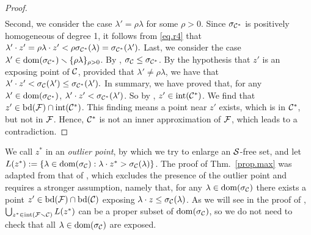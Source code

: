\begin{proof}
\begin{align}
	\end{align} Second, we consider the case $\lambda ' = \rho \lambda$ for some $\rho > 0$. Since $\sigma_{\mathcal C^\ast}$ is positively homogeneous of degree 1, it follows from \eqref{eq.r4} that $\lambda' \cdot z' =  {\rho \lambda} \cdot z' < \rho \sigma_{\mathcal C^\ast}({ \lambda}) = \sigma_{\mathcal C^\ast}({\lambda'}).$ Last, we consider the case ${\lambda'} \in \operatorname{dom}(\sigma_{\mathcal C^\ast}) \smallsetminus\{{\rho \lambda}\}_{\rho > 0}$. By , $\sigma_{\mathcal C} \le \sigma_{\mathcal C^\ast}$. 
	By the hypothesis that $z'$ is an exposing point of $\mathcal C$, provided that $\lambda' \ne \rho \lambda$,  we have that
	$
    	{\lambda'}\cdot z' < \sigma_{\mathcal C}({\lambda'}) \le	\sigma_{\mathcal C^\ast}({\lambda'}).
	$
	In summary, we have proved that, for any \({\lambda'} \in \operatorname{dom}(\sigma_{\mathcal C^\ast})\), \({\lambda'}\cdot z' < 	\sigma_{\mathcal C^\ast}({\lambda'})\). So by , \(z' \in \operatorname{int}(\mathcal C^\ast)\). We find that $z' \in \operatorname{bd}(\mathcal F) \cap \operatorname{int}(\mathcal C^\ast)$. This finding means a point near  $z'$ exists, which is in $\mathcal C^\ast$, but not in $\mathcal F$. Hence, $\mathcal C^\ast$ is not an inner approximation of $\mathcal F$, which leads to a contradiction.
	\end{proof}
 
We call  $z^\ast$ in  an \emph{outlier point}, by which we try to enlarge an $\mathcal S$-free set, and let $L(z^\ast):=\{\lambda \in \operatorname{dom}(\sigma_{\mathcal C}):\lambda \cdot z^\ast > \sigma_{\mathcal C}(\lambda)\}$. The proof of Thm.~\ref{prop.max} was adapted from that of \cite[Thm.~2]{munoz2020maximal}, which excludes the presence of the outlier point and requires a stronger assumption, namely that, for any $\lambda \in \operatorname{dom}(\sigma_{\mathcal C})$ there exists a point $z' \in \operatorname{bd}(\mathcal F) \cap \operatorname{bd}(\mathcal C)$ exposing $\lambda \cdot z \le \sigma_{\mathcal C}(\lambda)$. As we will see in the proof of , $\bigcup_{z^\ast \in \operatorname{int}(\mathcal F \smallsetminus \mathcal C)} L(z^\ast)$ can be a proper subset of $\operatorname{dom}(\sigma_{\mathcal C})$, so we do not need to check that all $\lambda \in \operatorname{dom}(\sigma_{\mathcal C})$ are exposed.
 

